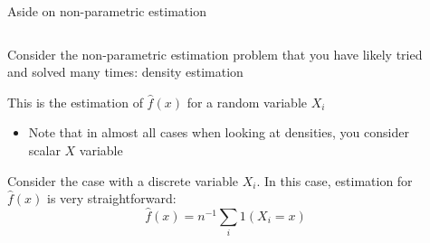 \documentclass[notes,11pt, aspectratio=169]{beamer}
\newenvironment{wideitemize}{\itemize\addtolength{\itemsep}{10pt}}{\enditemize}
\begin{document}
\begin{frame}{Aside on non-parametric estimation}
  \begin{columns}[onlytextwidth, T] %
    \begin{column}{.8\textwidth}
      \begin{wideitemize}
      \item Consider the non-parametric estimation problem that you have
        likely tried and solved many times: density estimation
      \item This is the estimation of $\hat{f}(x)$ for a random variable $X_{i}$
        \begin{itemize}
        \item Note that in almost all cases when looking at densities, you
        consider scalar $X$ variable
        \end{itemize}
      \item Consider the case with a discrete variable $X_{i}$. In this case, estimation for $\hat{f}(x)$ is very straightforward:
        \begin{equation*}
          \hat{f}(x) = n^{-1}\sum_{i} 1(X_{i} = x)
        \end{equation*}
      \end{wideitemize}
    \end{column}%
    \hfill%
    \begin{column}{.4\textwidth}
    \end{column}%
  \end{columns}
\end{frame}
\end{document}
